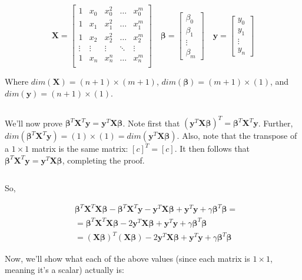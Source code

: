 \documentclass{article}
\newcommand{\y}{\mathbf{y}}
\newcommand{\X}{\mathbf{X}}
\newcommand{\B}{\boldsymbol\beta} %
\begin{document}
\begin{equation*}
    \X =
    \begin{bmatrix}
        1 & x_0 & x_0 ^2 & \ldots & x_0^m \\
        1 & x_1 & x_1 ^2 & \ldots & x_1^m \\
        1 & x_2 & x_2 ^2 & \ldots & x_2^m \\
        \vdots & \vdots & \vdots & \ddots & \vdots \\
        1 & x_n & x_n ^n & \ldots & x_n^m \\
    \end{bmatrix}
    \quad
    \B =
    \begin{bmatrix}
        \beta_0\\
        \beta_1\\
        \vdots\\
        \beta_m
    \end{bmatrix}
    \quad
    \y =
    \begin{bmatrix}
        y_0\\
        y_1\\
        \vdots\\
        y_n
    \end{bmatrix}
\end{equation*}

Where $dim(\X)=(n+1)\times(m+1)$, $dim(\B)=(m+1)\times(1)$, and $dim(\y)=(n+1)\times(1)$.

$ $ %

We'll now prove $\B^T\X^T\y = \y^T\X\B$. Note first that $(\y^T\X\B)^T=\B^T\X^T\y$. Further, $dim(\B^T\X^T\y) = (1) \times (1) = dim(\y^T\X\B)$. Also, note that the transpose of a $1 \times 1$ matrix is the same matrix: $[c]^T=[c]$. It then follows that $\B^T\X^T\y = \y^T\X\B$, completing the proof.

$ $ %

So,

\begin{equation} \label{eqn:rls_prod}
\begin{split}
    &\B^T \X^T \X\B - \B^T \X^T \y - \y^T \X\B + \y^T \y + \gamma \B^T \B = \\ 
    & = \B^T \X^T \X\B -2 \y^T \X\B + \y^T \y + \gamma \B^T \B\\
    & = (\X\B)^T(\X\B) -2 \y^T \X\B + \y^T \y + \gamma \B^T \B
\end{split}
\end{equation}

Now, we'll show what each of the above values (since each matrix is $1 \times 1$, meaning it's a scalar) actually is:
\end{document}
